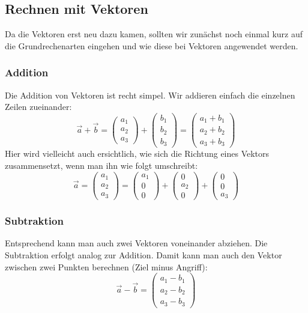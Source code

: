 \subsection{Rechnen mit Vektoren}
Da die Vektoren erst neu dazu kamen, sollten wir zunächst noch einmal kurz auf die Grundrechenarten eingehen und wie diese bei Vektoren angewendet werden.
\subsubsection{Addition}
Die Addition von Vektoren ist recht simpel. Wir addieren einfach die einzelnen Zeilen zueinander:
\[\vec{a}+\vec{b}=
\begin{pmatrix}
 a_1\\
 a_2\\
 a_3
\end{pmatrix}+\begin{pmatrix}
 b_1\\
 b_2\\
 b_3
\end{pmatrix}
=
\begin{pmatrix}
 a_1+b_1\\
 a_2+b_2\\
 a_3+b_3
\end{pmatrix} \]
Hier wird vielleicht auch ersichtlich, wie sich die Richtung eines Vektors zusammensetzt, wenn man ihn wie folgt umschreibt:
\[\vec{a}=
\begin{pmatrix}
 a_1\\
 a_2\\
 a_3
\end{pmatrix}=
\begin{pmatrix}
 a_1\\
 0\\
 0
\end{pmatrix} +
\begin{pmatrix}
 0\\
 a_2\\
 0
\end{pmatrix} +
\begin{pmatrix}
 0\\
 0\\
 a_3
\end{pmatrix}
\]
\subsubsection{Subtraktion}
Entsprechend kann man auch zwei Vektoren voneinander abziehen. Die Subtraktion erfolgt analog zur Addition. Damit kann man auch den Vektor zwischen zwei Punkten berechnen (Ziel minus Angriff):
\[\vec{a}-\vec{b}=\begin{pmatrix}
 a_1-b_1\\
 a_2-b_2\\
 a_3-b_3
\end{pmatrix}\]
